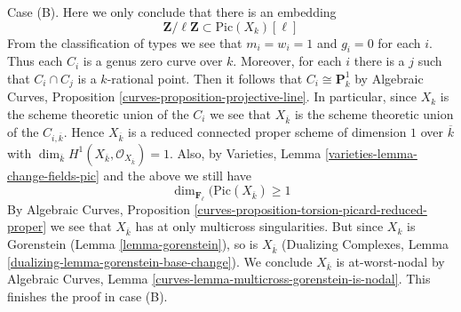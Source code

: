 \medskip\noindent
Case (B). Here we only conclude that there is an embedding
$$
\mathbf{Z}/\ell \mathbf{Z} \subset \text{Pic}(X_k)[\ell]
$$
From the classification of types we see that $m_i = w_i = 1$ and $g_i = 0$
for each $i$. Thus each $C_i$ is a genus zero curve over $k$.
Moreover, for each $i$ there is a $j$ such that
$C_i \cap C_j$ is a $k$-rational point. Then it follows that
$C_i \cong \mathbf{P}^1_k$ by
Algebraic Curves, Proposition \ref{curves-proposition-projective-line}.
In particular, since $X_k$ is the scheme theoretic union of the
$C_i$ we see that $X_{\overline{k}}$ is the
scheme theoretic union of the $C_{i, \overline{k}}$.
Hence $X_{\overline{k}}$ is a reduced connected proper
scheme of dimension $1$ over $\overline{k}$ with $\dim_{\overline{k}}
H^1(X_{\overline{k}}, \mathcal{O}_{X_{\overline{k}}}) = 1$.
Also, by Varieties, Lemma \ref{varieties-lemma-change-fields-pic}
and the above we still have
$$
\dim_{\mathbf{F}_\ell}(\text{Pic}(X_{\overline{k}}) \geq 1
$$
By Algebraic Curves, Proposition
\ref{curves-proposition-torsion-picard-reduced-proper}
we see that $X_{\overline{k}}$ has at only multicross singularities.
But since $X_k$ is Gorenstein (Lemma \ref{lemma-gorenstein}),
so is $X_{\overline{k}}$ (Dualizing Complexes, Lemma
\ref{dualizing-lemma-gorenstein-base-change}).
We conclude $X_{\overline{k}}$ is at-worst-nodal by
Algebraic Curves, Lemma \ref{curves-lemma-multicross-gorenstein-is-nodal}.
This finishes the proof in case (B).

